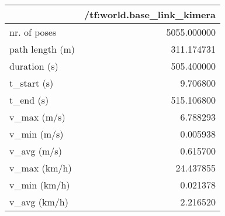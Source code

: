 \begin{tabular}{lr}
\toprule
{} &  /tf:world.base\_link\_kimera \\
\midrule
nr. of poses    &                 5055.000000 \\
path length (m) &                  311.174731 \\
duration (s)    &                  505.400000 \\
t\_start (s)     &                    9.706800 \\
t\_end (s)       &                  515.106800 \\
v\_max (m/s)     &                    6.788293 \\
v\_min (m/s)     &                    0.005938 \\
v\_avg (m/s)     &                    0.615700 \\
v\_max (km/h)    &                   24.437855 \\
v\_min (km/h)    &                    0.021378 \\
v\_avg (km/h)    &                    2.216520 \\
\bottomrule
\end{tabular}
